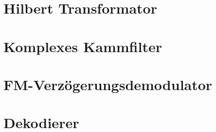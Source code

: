 \documentclass{beamer}
\begin{document}
\section{Hilbert Transformator}
\section{Komplexes Kammfilter}
\section{FM-Verzögerungsdemodulator}
\section{Dekodierer}
\end{document}
